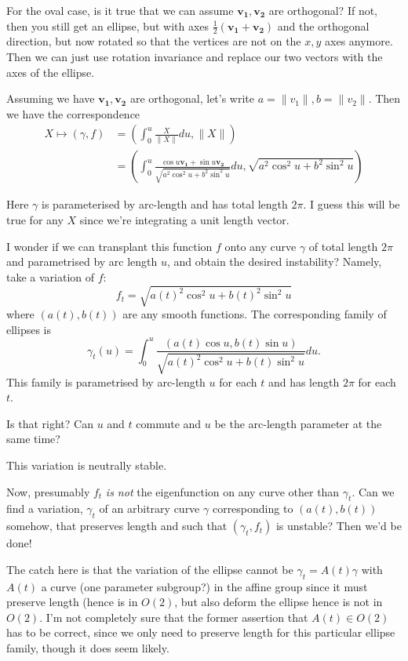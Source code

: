 \documentclass{amsart}
\begin{document}
For the oval case, is it true that we can assume \(\mathbf{v_1}, \mathbf{v_2}\) are orthogonal? If not, then you still get an ellipse, but with axes \(\tfrac{1}{2} (\mathbf{v_1} +  \mathbf{v_2})\) and the orthogonal direction, but now rotated so that the vertices are not on the \(x,y\) axes anymore. Then we can just use rotation invariance and replace our two vectors with the axes of the ellipse.

Assuming we have \(\mathbf{v_1}, \mathbf{v_2}\) are orthogonal, let's write 
\(a = \|v_1\|, b = \|v_2\|\). Then we have the correspondence 
\[
\begin{split}
X \mapsto (\gamma, f) &= \left(\int_0^{u} \frac{X}{\|X\|} du, \|X\|\right) \\
&= \left(\int_0^{u} \frac{\cos u \mathbf{v_1} + \sin u \mathbf{v_2}}{\sqrt{a^2 \cos^2 u + b^2 \sin^2 u}} du, \sqrt{a^2 \cos^2 u + b^2 \sin^2 u} \right)
\end{split}
\]

Here \(\gamma\) is parameterised by arc-length and has total length \(2\pi\). I guess this will be true for any \(X\) since we're integrating a unit length vector. 

I wonder if we can transplant this function \(f\) onto any curve \(\gamma\)  of total length \(2\pi\) and parametrised by arc length \(u\), and obtain the desired instability? Namely, take a variation of \(f\):
\[
f_t = \sqrt{a(t)^2 \cos^2 u + b(t)^2 \sin^2 u}
\]
where \((a(t), b(t))\) are any smooth functions. The corresponding family of ellipses is
\[
\gamma_t(u) = \int_0^u \frac{(a(t) \cos u, b(t) \sin u)}{\sqrt{a(t)^2 \cos^2 u + b(t) \sin^2 u}} du.
\]
This family is parametrised by arc-length \(u\) for each \(t\) and has length \(2\pi\) for each \(t\).

Is that right? Can \(u\) and \(t\) commute and \(u\) be the arc-length parameter at the same time?

This variation is neutrally stable.

Now, presumably \(f_t\) \emph{is not} the eigenfunction on any curve other than \(\gamma_t\). Can we find a variation, \(\gamma_t\) of an arbitrary curve \(\gamma\) corresponding to \((a(t), b(t))\) somehow, that preserves length and such that \((\gamma_t, f_t)\) is unstable? Then we'd be done!

The catch here is that the variation of the ellipse cannot be \(\gamma_t = A(t) \gamma\) with \(A(t)\) a curve (one parameter subgroup?) in the affine group since it must preserve length (hence is in \(O(2)\), but also deform the ellipse hence is not in \(O(2)\). I'm not completely sure that the former assertion that \(A(t) \in O(2)\) has to be correct, since we only need to preserve length for this particular ellipse family, though it does seem likely.
\end{document}
